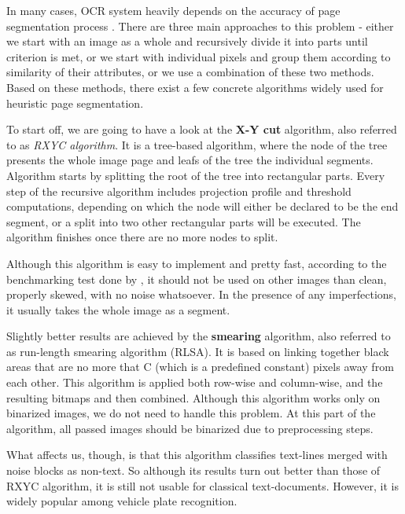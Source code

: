 In many cases, OCR system heavily depends on the accuracy of page segmentation process \citep{pageSegmentation}. There are three main approaches \citep{segmentationBenchmark} to this problem - either we start with an image as a whole and recursively divide it into parts until criterion is met, or we start with individual pixels and group them according to similarity of their attributes, or we use a combination of these two methods. Based on these methods, there exist a few concrete algorithms widely used for heuristic page segmentation.

\begin{description}

\item To start off, we are going to have a look at the \textbf{X-Y cut } algorithm, also referred to as \emph{RXYC algorithm}. It is a tree-based algorithm, where the node of the tree presents the whole image page and leafs of the tree the individual segments. Algorithm starts by splitting the root of the tree into rectangular parts. Every step of the recursive algorithm includes projection profile and threshold computations, depending on which the node will either be declared to be the end segment, or a split into two other rectangular parts will be executed. The algorithm finishes once there are no more nodes to split.

Although this algorithm is easy to implement and pretty fast, according to the benchmarking test done by \citet{segmentationBenchmark}, it should not be used on other images than clean, properly skewed, with no noise whatsoever. In the presence of any imperfections, it usually takes the whole image as a segment.

\item Slightly better results are achieved by the \textbf{smearing } algorithm, also referred to as run-length smearing algorithm (RLSA). It is based on linking together black areas that are no more that C (which is a predefined constant) pixels away from each other. This algorithm is applied both row-wise and column-wise, and the resulting bitmaps and then combined. Although this algorithm works only on binarized images, we do not need to handle this problem. At this part of the algorithm, all passed images should be binarized due to preprocessing steps.

What affects us, though, is that this algorithm classifies text-lines merged with noise blocks as non-text. So although its results turn out better than those of RXYC algorithm, it is still not usable for classical text-documents. However, it is widely popular among vehicle plate recognition.


\end{description}
